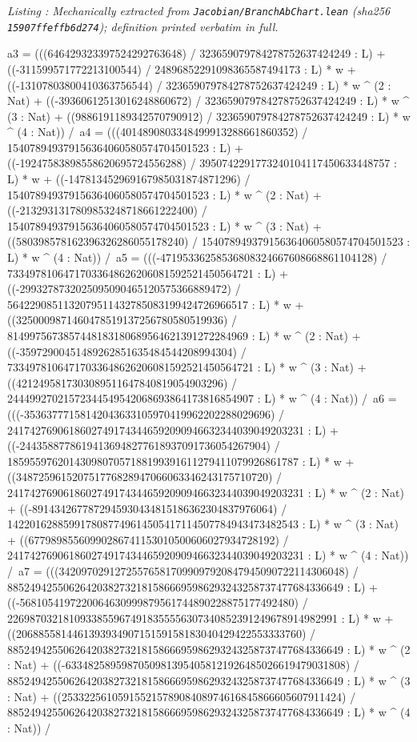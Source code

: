 \documentclass[a4paper,11pt]{article}
\newcounter{leanlisting}
\newenvironment{leanlisting}[2]{%
  \refstepcounter{leanlisting}\label{#2}%
  \begin{center}\textit{\small\color{inksecondary}Listing \theleanlisting: #1}\end{center}%
  \Verbatim[breaklines=true,breakanywhere=true,fontsize=\footnotesize,frame=single,framesep=4pt,rulecolor=\color{borderstrong},fillcolor=\color{bgsubtle}]%
}{%
  \endVerbatim%
}
\theoremstyle{jsplain}
\theoremstyle{jsdef}
\theoremstyle{jsrem}
\begin{document}
\begin{leanlisting}{Mechanically extracted from \texttt{Jacobian/BranchAbChart.lean} (sha256 \texttt{15907ffeffb6d274}); definition printed verbatim in full.}{ab:lst:def-chartclass}
      a3 = (((646429323397524292763648) / 323659079784278752637424249 : L) + ((-311599571772213100544) / 24896852291098365587494173 : L) * w + ((-13107803800410363756544) / 323659079784278752637424249 : L) * w ^ (2 : Nat) + ((-39360612513016248860672) / 323659079784278752637424249 : L) * w ^ (3 : Nat) + ((9886191189342570790912) / 323659079784278752637424249 : L) * w ^ (4 : Nat)) /\
      a4 = (((4014890803348499913288661860352) / 154078949379156364060580574704501523 : L) + ((-19247583898558620695724556288) / 3950742291773240104117450633448757 : L) * w + ((-147813452969167985031874871296) / 154078949379156364060580574704501523 : L) * w ^ (2 : Nat) + ((-2132931317809853248718661222400) / 154078949379156364060580574704501523 : L) * w ^ (3 : Nat) + ((580398578162396326286055178240) / 154078949379156364060580574704501523 : L) * w ^ (4 : Nat)) /\
      a5 = (((-47195336258536808324667608668861104128) / 73349781064717033648626206081592521450564721 : L) + ((-2993278732025095090465120575366889472) / 5642290851132079511432785083199424726966517 : L) * w + ((3250009871460478519137256780580519936) / 8149975673857448183180689564621391272284969 : L) * w ^ (2 : Nat) + ((-35972900451489262851635484544208994304) / 73349781064717033648626206081592521450564721 : L) * w ^ (3 : Nat) + ((4212495817303089511647840819054903296) / 24449927021572344549542068693864173816854907 : L) * w ^ (4 : Nat)) /\
      a6 = (((-35363777158142043633105970419962202288029696) / 24174276906186027491743446592090946632344039049203231 : L) + ((-24435887786194136948277618937091736054267904) / 1859559762014309807057188199391611279411079926861787 : L) * w + ((348725961520751776828947066063346243175710720) / 24174276906186027491743446592090946632344039049203231 : L) * w ^ (2 : Nat) + ((-8914342677872945930434815186362304837976064) / 1422016288599178087749614505417114507784943473482543 : L) * w ^ (3 : Nat) + ((67798985560990286741153010500606027934728192) / 24174276906186027491743446592090946632344039049203231 : L) * w ^ (4 : Nat)) /\
      a7 = (((342097029127255765817099097920847945090722114306048) / 885249425506264203827321815866695986293243258737477684336649 : L) + ((-5681054197220064630999879561744890228875177492480) / 22698703218109338559674918355556307340852391249678914982991 : L) * w + ((206885581446139393490715159158183040429422553333760) / 885249425506264203827321815866695986293243258737477684336649 : L) * w ^ (2 : Nat) + ((-63348258959870509813954058121926485026619479031808) / 885249425506264203827321815866695986293243258737477684336649 : L) * w ^ (3 : Nat) + ((25332256105915521578908408974616845866605607911424) / 885249425506264203827321815866695986293243258737477684336649 : L) * w ^ (4 : Nat)) /\

\end{leanlisting}
\end{document}
